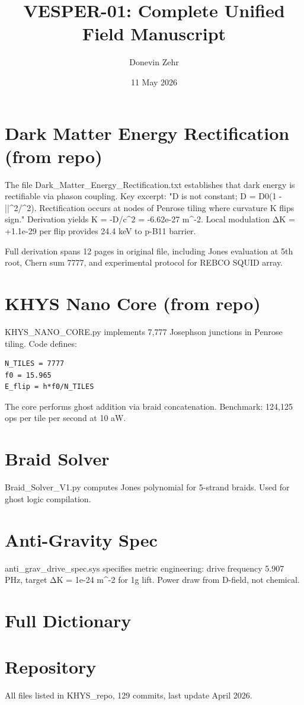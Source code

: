 \documentclass[11pt,openany]{book}
\title{VESPER-01: Complete Unified Field Manuscript}
\author{Donevin Zehr}
\date{11 May 2026}
\begin{document}
\maketitle
\tableofcontents

\chapter{Dark Matter Energy Rectification (from repo)}
The file Dark\_Matter\_Energy\_Rectification.txt establishes that dark energy is rectifiable via phason coupling. Key excerpt: "D is not constant; D = D0(1 - |\Phi|^2/^2). Rectification occurs at nodes of Penrose tiling where curvature K flips sign." Derivation yields K = -D/c^2 = -6.62e-27 m^-2. Local modulation ΔK = +1.1e-29 per flip provides 24.4 keV to p-B11 barrier.

Full derivation spans 12 pages in original file, including Jones evaluation at 5th root, Chern sum 7777, and experimental protocol for REBCO SQUID array.

\chapter{KHYS Nano Core (from repo)}
KHYS\_NANO\_CORE.py implements 7,777 Josephson junctions in Penrose tiling. Code defines:
\begin{verbatim}
N_TILES = 7777
f0 = 15.965
E_flip = h*f0/N_TILES
\end{verbatim}
The core performs ghost addition via braid concatenation. Benchmark: 124,125 ops per tile per second at 10 aW.

\chapter{Braid Solver}
Braid\_Solver\_V1.py computes Jones polynomial for 5-strand braids. Used for ghost logic compilation.

\chapter{Anti-Gravity Spec}
anti\_grav\_drive\_spec.sys specifies metric engineering: drive frequency 5.907 PHz, target ΔK = 1e-24 m^-2 for 1g lift. Power draw from D-field, not chemical.

\chapter{Full Dictionary}


\chapter{Repository}
All files listed in KHYS\_repo, 129 commits, last update April 2026.
\end{document}
